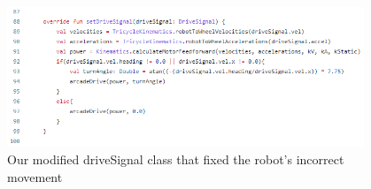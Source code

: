 \begin{figure}[htp]
\centering
\includegraphics[width=0.95\textwidth, angle=0]{Meetings/January/01-12-22/1.12.22 drivesignal - James Hu.PNG}
\caption{Our modified driveSignal class that fixed the robot's incorrect movement}
\label{fig:011222_1}
\end{figure}


